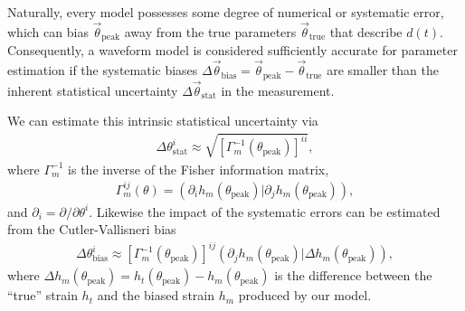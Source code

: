 \documentclass[%
 reprint,
 nofootinbib,
 amsmath,amssymb,
 aps,
 prd,
]{revtex4-2}
\begin{document}
Naturally, every model possesses some degree of numerical or systematic error, which can bias $\vec{\theta}_\mathrm{peak}$ away from the true parameters $\vec{\theta}_\mathrm{true}$ that describe $d(t)$. Consequently, a waveform model is considered sufficiently accurate for parameter estimation if the systematic biases $\Delta \vec{\theta}_\mathrm{bias} = \vec{\theta}_\mathrm{peak} - \vec{\theta}_\mathrm{true}$ are smaller than the inherent statistical uncertainty $\Delta \vec{\theta}_\mathrm{stat}$ in the measurement.

We can estimate this intrinsic statistical uncertainty via
\begin{align} \label{eqn:stat}
    \Delta {\theta}^{i}_\mathrm{stat} \approx \sqrt{\left[\Gamma^{-1}_m(\theta_\mathrm{peak})\right]^{ii}},
\end{align}
where $\Gamma^{-1}_m$ is the inverse of the Fisher information matrix,
\begin{align} \label{eqn:fisher}
    \Gamma^{ij}_m(\theta) = \left( {\partial_i h_m(\theta_\mathrm{peak})} \vert {\partial_j h_m(\theta_\mathrm{peak})} \right),
\end{align}
and $\partial_i = \partial/\partial \theta^i$.
Likewise the impact of the systematic errors can be estimated from the Cutler-Vallisneri bias \cite{CutlVall07}
\begin{align} \label{eqn:bias}
    \Delta {\theta}^{i}_\mathrm{bias} \approx \left[\Gamma^{-1}_m(\theta_\mathrm{peak})\right]^{ij} \left(\partial_j h_m(\theta_\mathrm{peak}) \vert \Delta h_m(\theta_\mathrm{peak}) \right),
\end{align}
where $\Delta h_m(\theta_\mathrm{peak}) = h_t(\theta_\mathrm{peak}) - h_m(\theta_\mathrm{peak})$ is the difference between the ``true'' strain $h_t$ and the biased strain $h_m$ produced by our model.
\end{document}
